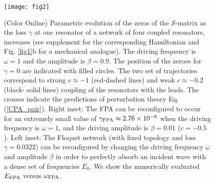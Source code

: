 \documentclass[aps,prl,twocolumn,showpacs,groupedaddress,amsmath,amssymb]{revtex4}
\begin{document}
\begin{figure}
\texttt{[image: fig2]}
\caption{(Color Online) Parametric evolution of the zeros of the $\mathcal{S}$-matrix as the loss $\gamma$ at one resonator of a 
network of four coupled resonators, increases (see supplement for the corresponding Hamiltonian and Fig. \ref{fig1}b for a mechanical
analogue). The driving frequency is $\omega=1$ and the amplitude is $\beta=0.9$. The position of the zeroes for $\gamma=0$ are 
indicated with filled circles. The two set of trajectories correspond to strong $c\approx -1$ (red-dashed lines) and weak $c\approx -0.2$ 
(black- solid lines) coupling of the resonators with the leads. The crosses indicate the predictions of perturbation theory Eq. (\ref{CPA_pair}). 
Right inset: The FPA can be reconfigured to occur for an extremely small value of $\gamma_{\rm FPA}\approx 2.76\times 10^{-6}$ 
when the driving frequency is $\omega=1$, and the driving amplitude is $\beta=0.01$ ($c=-0.5$). Left inset: The Floquet 
network (with fixed topology and loss $\gamma=0.0322$) can be reconfigured by changing the driving frequency $\omega$ and amplitude 
$\beta$ in order to perfectly absorb an incident wave with a dense set of frequencies $E_0$. We show the numerically evaluated 
$E_{\rm FPA}$ versus $\omega_{\rm FPA}$.  
}
\label{fig2}
\end{figure}
\end{document}
